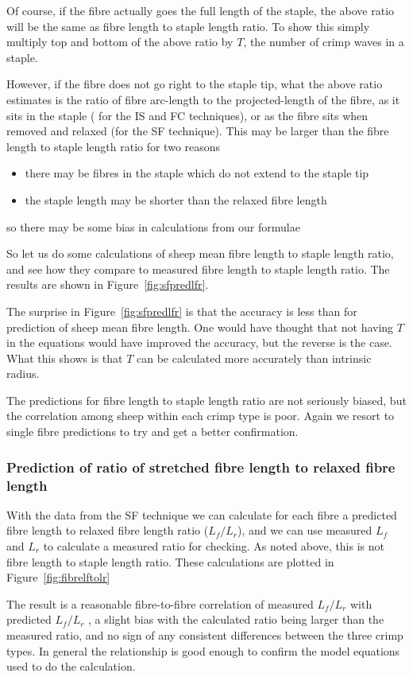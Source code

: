 \documentclass[titlepage,10pt]{article}  %
\begin{document}
 Of course, if the fibre actually goes the full length of the staple, the above ratio will be the same as fibre length to staple length ratio. To show this simply multiply top and bottom of the above ratio by $T$, the number of crimp waves in a staple.

 However, if the fibre does not go right to the staple tip, what the above ratio estimates is the ratio of fibre arc-length to the projected-length of the fibre, as it sits in the staple ( for the IS and FC techniques), or as the fibre sits when removed and relaxed (for the SF technique).  This may be larger than the fibre length to staple length ratio for two reasons
\begin{itemize}
\item there may be fibres in the staple which do not extend to the staple tip
\item the staple length may be shorter than the relaxed fibre length
\end{itemize}
 so there may be some bias in calculations from our formulae

So let us do some calculations of sheep mean fibre length to staple length ratio, and see how they compare to measured fibre length to staple length ratio.  The results are shown in  Figure~\ref{fig:sfpredlfr}.




The surprise in Figure~\ref{fig:sfpredlfr} is that the accuracy is less than for prediction of sheep mean fibre length.  One would have thought that not having $T$ in the equations would have improved the accuracy, but the reverse is the case. What this shows is that $T$ can be calculated more accurately than intrinsic radius.

The predictions for fibre length to staple length ratio are not seriously biased, but the correlation among sheep within each crimp type is poor.  Again we resort to single fibre predictions to try and get a better confirmation.

\subsubsection{Prediction of ratio of stretched fibre length to relaxed fibre length}
With the data from the SF technique we can calculate for each fibre a predicted fibre length to relaxed fibre length ratio ($L_{f}/L_{r}$), and we can use measured $L_{f}$ and $L_{r}$ to calculate a measured ratio for checking. As noted above, this is not fibre length to staple length ratio. These calculations are plotted in Figure~\ref{fig:fibrelftolr}

The result is a reasonable fibre-to-fibre correlation of measured $L_{f}/L_{r}$ with predicted $L_{f}/L_{r}$ , a slight bias with the calculated ratio being larger than the measured ratio, and no sign of any consistent differences between the three crimp types. In general the relationship is good enough to confirm the model equations used to do the calculation.
\end{document}
